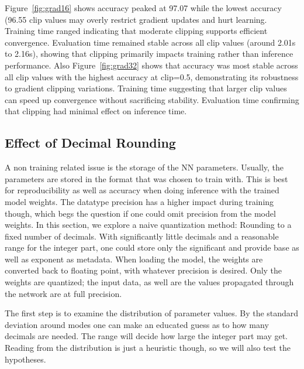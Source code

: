\documentclass[11pt]{article}
\begin{document}
Figure~\ref{fig:grad16} shows accuracy peaked at 97.07%
while the lowest accuracy (96.55%
clip values may overly restrict gradient updates and hurt learning.
Training time ranged indicating that moderate clipping supports efficient convergence.
Evaluation time remained stable across all clip values (around 2.01s to 2.16s),
showing that clipping primarily impacts training rather than inference performance. 
Also Figure~\ref{fig:grad32} shows that accuracy was most stable across all clip values
with the highest accuracy at clip=0.5, demonstrating its robustness to gradient clipping
variations. Training time suggesting that larger clip values can speed up convergence
without sacrificing stability.
Evaluation time confirming that clipping had minimal effect on inference time.

\subsection*{Effect of Decimal Rounding}

A non training related issue is the storage of the NN parameters. Usually, the parameters
are stored in the format that was chosen to train with. This is best for reproducibility
as well as accuracy when doing inference with the trained model weights. The datatype  
precision has a higher impact during training though, which begs the question if one could
omit precision from the model weights. In this section, we explore a naive quantization
method: Rounding to a fixed number of decimals. With significantly little decimals and a
reasonable range for the integer part, one could store only the significant and provide
base as well as exponent as metadata. When loading the model, the weights are converted
back to floating point, with whatever precision is desired. Only the weights are quantized;
the input data, as well are the values propagated through the network are at full
precision.

The first step is to examine the distribution of parameter values. By the standard
deviation around modes one can make an educated guess as to how many decimals are needed.
The range will decide how large the integer part may get. Reading from the 
distribution is just a heuristic though, so we will also test the hypotheses.
\end{document}
